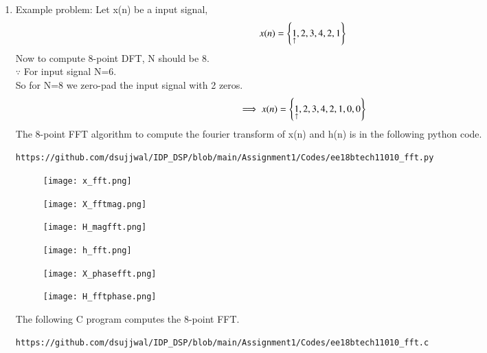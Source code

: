 \documentclass[journal,12pt,twocolumn]{IEEEtran}
\renewcommand\thesection{\arabic{section}}
\begin{document}
\begin{enumerate}[label=\thesection.\arabic*.,ref=\thesection.\theenumi]
\item
Example problem:
Let x(n) be a input signal,
\begin{align}
    x(n) = \left\{\underset{\uparrow}{1},2,3,4,2,1\right\} 
\end{align}
Now to compute 8-point DFT, N should be 8. \\
$\because$ For input signal N=6.\\
So for N=8 we zero-pad the input signal with 2 zeros.\\
\begin{align}
    \implies x(n) = \left\{\underset{\uparrow}{1},2,3,4,2,1,0,0\right\} 
\end{align}
The 8-point FFT algorithm to compute the fourier transform of x(n) and h(n) is in the following python code.
\begin{lstlisting}
https://github.com/dsujjwal/IDP_DSP/blob/main/Assignment1/Codes/ee18btech11010_fft.py
\end{lstlisting}
\bigskip
\begin{figure}[h!]
    \centering
    \texttt{[image: x\_fft.png]}
    \label{figs}
\end{figure}
\begin{figure}[h!]
    \centering
    \texttt{[image: X\_fftmag.png]}
    \label{figs}
\end{figure}
\begin{figure}[h!]
    \centering
    \texttt{[image: H\_magfft.png]}
    \label{figs}
\end{figure}
\begin{figure}[h!]
    \centering
    \texttt{[image: h\_fft.png]}
    \label{figs}
\end{figure}
\vspace{1cm}
\begin{figure}[h!]
    \centering
    \texttt{[image: X\_phasefft.png]}
    \label{figs}
\end{figure}
\begin{figure}[h!]
    \centering
    \texttt{[image: H\_fftphase.png]}
    \label{figs}
\end{figure}

The following C program computes the 8-point FFT.
\begin{lstlisting}
https://github.com/dsujjwal/IDP_DSP/blob/main/Assignment1/Codes/ee18btech11010_fft.c
\end{lstlisting}

\end{enumerate}
\end{document}

